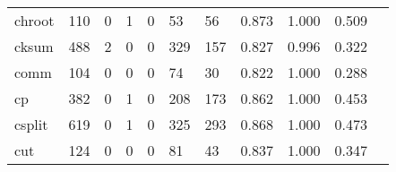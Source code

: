 \begin{longtable}{lp{1.2cm}p{1.2cm}p{1.2cm}p{1.2cm}p{1.2cm}p{1.2cm}p{1.2cm}p{1.2cm}p{1.2cm}p{1.2cm}}
chroot    &                                   110 &                                                  0 &                                                  1 &                                                  0 &                                                 53 &                                                 56 &                                              0.873 &                                              1.000 &                                              0.509 \\
cksum     &                                   488 &                                                  2 &                                                  0 &                                                  0 &                                                329 &                                                157 &                                              0.827 &                                              0.996 &                                              0.322 \\
comm      &                                   104 &                                                  0 &                                                  0 &                                                  0 &                                                 74 &                                                 30 &                                              0.822 &                                              1.000 &                                              0.288 \\
cp        &                                   382 &                                                  0 &                                                  1 &                                                  0 &                                                208 &                                                173 &                                              0.862 &                                              1.000 &                                              0.453 \\
csplit    &                                   619 &                                                  0 &                                                  1 &                                                  0 &                                                325 &                                                293 &                                              0.868 &                                              1.000 &                                              0.473 \\
cut       &                                   124 &                                                  0 &                                                  0 &                                                  0 &                                                 81 &                                                 43 &                                              0.837 &                                              1.000 &                                              0.347 \\

\end{longtable}
